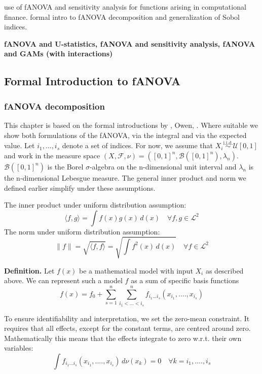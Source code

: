 \cite{liu2006} use of fANOVA and sensitivity analysis for functions arising in computational finance.
\cite{owen2013} formal intro to fANOVA decomposition and generalization of Sobol indices.

\textbf{fANOVA and U-statistics, fANOVA and sensitivity analysis, fANOVA and GAMs (with interactions)}

\subsection{Formal Introduction to fANOVA}

\subsubsection*{fANOVA decomposition}
This chapter is based on the formal introductions by \cite{sobol1993sensitivity, sobol2001, hooker2004}, Owen, \cite{muehlenstaedt2012}. Where suitable we show both formulations of the fANOVA, via the integral and via the expected value.
Let $i_1, \dots , i_s$ denote a set of indices. For now, we assume that $X_i \overset{\text{i.i.d.}}{\sim} \mathcal{U}[0, 1]$ and work in the measure space $(X, \mathcal{F}, \nu) = ([0, 1]^n, \mathcal{B}([0, 1]^n), \lambda_{n})$. $\mathcal{B}([0, 1]^n)$ is the Borel $\sigma$-algebra on the n-dimensional unit interval and $\lambda_{n}$ is the n-dimensional Lebesgue measure. 
The general inner product and norm we defined earlier simplify under these assumptions.\par
The inner product under uniform distribution assumption:
\[
\langle f, g \rangle = \int f(x) g(x) \, d(x) \quad \forall f, g \in \mathcal{L}^2
\]
The norm under uniform distribution assumption:
\[
\|f\| = \sqrt{\langle f, f \rangle} = \sqrt{\int f^2(x) \, d(x)} \quad \forall f \in \mathcal{L}^2
\]

\textbf{Definition.} Let $f(x)$  be a mathematical model with input $X_i$ as described above. We can represent such a model $f$ as a sum of specific basis functions
\begin{equation}
    f(x) = f_0 + \sum_{s=1}^{n} \sum_{i_1 <...<i_s}^{n} f_{i_{1}...i_{s}} (x_{i_{1}} , ....,x_{i_{s}})
    \label{eq:fanova_decomposition}
\end{equation}

To ensure identifiability and interpretation, we set the zero-mean constraint. It requires that all effects, except for the constant terms, are centred around zero.
Mathematically this means that the effects integrate to zero w.r.t. their own variables:
\begin{equation}
    \int f_{i_{1}...i_{s}} (x_{i_{1}}, ...., x_{i_{s}}) \, d\nu (x_k) = 0 \quad \forall k = i_1, ...., i_s
    \label{eq:zero_mean_condition}
\end{equation}

